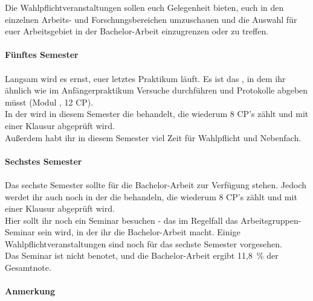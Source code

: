 Die Wahlpflichtveranstaltungen sollen euch Gelegenheit bieten, euch in den einzelnen Arbeits- und Forschungsbereichen umzuschauen und die Auswahl für euer Arbeitsgebiet in der Bachelor-Arbeit einzugrenzen oder zu treffen.
\\\\\hspace*{\fill}\textbf{Fünftes Semester}\hspace*{\fill}\\\\
Langsam wird es ernst, euer letztes Praktikum läuft. Es ist das , in dem ihr ähnlich wie im Anfängerpraktikum Versuche durchführen und Protokolle abgeben müsst (Modul , 12 CP).\\
In der  wird in diesem Semester die  behandelt, die wiederum 8 CP's zählt und mit einer Klausur abgeprüft wird.\\
Au\ss erdem habt ihr in diesem Semester viel Zeit für Wahlpflicht und Nebenfach.
\\\\\hspace*{\fill}\textbf{Sechstes Semester}\hspace*{\fill}\\\\
Das sechste Semester sollte für die Bachelor-Arbeit zur Verfügung stehen. Jedoch werdet ihr auch noch in der  die   behandeln, die wiederum 8 CP's zählt und mit einer Klausur abgeprüft wird.\\
Hier sollt ihr noch ein Seminar besuchen - das im Regelfall das Arbeitsgruppen-Seminar sein wird, in der ihr die Bachelor-Arbeit macht. Einige Wahlpflichtveranstaltungen sind noch für das sechste Semester vorgesehen.\\
Das Seminar ist nicht benotet, und die Bachelor-Arbeit ergibt 11,8~\% der Gesamtnote.
\\\\\textbf{Anmerkung}\hspace*{\fill}\\\\
